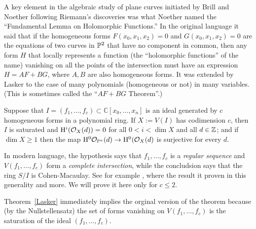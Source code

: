 \documentclass[12pt, leqno]{book}
\def\CC{{\mathbb C}}
\begin{document}
A key element in the algebraic study of plane curves initiated by Brill and Noether following Riemann's discoveries was what Noether named the ``Fundamental Lemma on Holomorphic Functions.'' In the original language it said that if the homogeneous forms $F(x_{0},x_{1},x_{2})=0$ and $G(x_{0},x_{1},x_{2})=0$ are the equations of two curves in ${\mathbb P}^{2}$ that have no component in common, then any form $H$ that locally represents a function (the ``holomorphic functions'' of the name) vanishing on all the points
of the intersection must have an expression $H = AF+BG$, where $A,B$ are also homogeneous forms. It was extended by Lasker to the case of many polynomials (homogeneous or not) in many variables. (This is sometimes called the ``$AF+BG$ Theorem''.) 

\begin{theorem}\label{Lasker}
Suppose that $I = (f_{1}, \dots, f_{c}) \subset \CC[x_{0},\dots,x_{n}]$ is an ideal generated by $c$ homogeneous forms in a polynomial ring. 
If $X:= V(I)$ has codimension $c$, then $I$ is saturated and ${\rm{H}}^{i}({\mathcal O}_{X}(d)) = 0$ for all $0<i<\dim X$ and all $d\in {\mathbb Z}$; and if $\dim X\geq 1$
then the map
${\rm{H}}^{0}{\mathcal O}_{{\mathbb P}^{n}}(d) \to {\rm{H}}^{0}({\mathcal O}_{X}(d)$ is surjective for every $d$.
\end{theorem}

In modern language, the hypothesis says that $f_{1}, \dots, f_{c}$ is a \emph{regular sequence} and $V(f_{1},\dots,f_{c})$ form a \emph{complete intersection}, while the concludsion says that the ring $S/I$ is Cohen-Macaulay. See for example \cite[Chapter 18]{Eisenbud95}, where the result it proven in this generality and more.
We will prove it here only for $c\leq 2$.

Theorem~\ref{Lasker} immediately implies the orginal version of the theorem because (by the Nullstellensatz) the set of forms vanishing on $V(f_{1}, \dots, f_{c})$ is the saturation 
of the ideal $(f_{1}, \dots, f_{c})$. 
\end{document}
